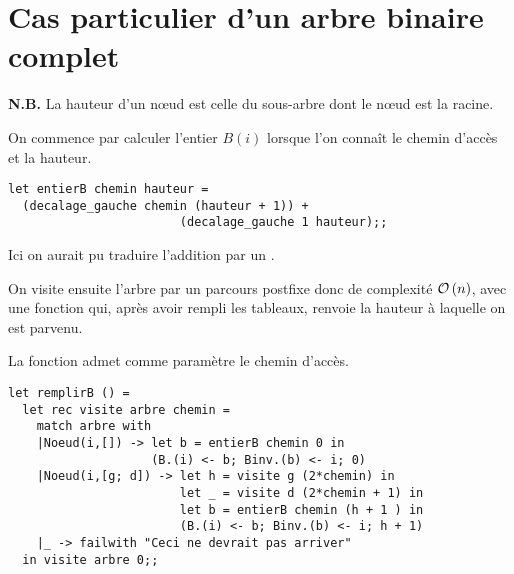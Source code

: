 \section{Cas particulier d'un arbre binaire complet}
{\bf N.B.} La hauteur d'un nœud est celle du sous-arbre dont le nœud est la racine.
\begin{Exercise}On commence par calculer l'entier $B(i)$ lorsque l'on connaît le chemin d'accès et la hauteur.

\begin{lstlisting}
let entierB chemin hauteur = 
  (decalage_gauche chemin (hauteur + 1)) + 
                        (decalage_gauche 1 hauteur);;
\end{lstlisting}

Ici on aurait pu traduire l'addition par un .

\medskip

On visite ensuite l'arbre par un parcours postfixe donc de complexité ${\cal O}\left(n\right)$, avec une fonction qui, après avoir rempli les tableaux, renvoie la hauteur à laquelle on est parvenu.

La fonction admet comme paramètre le chemin d'accès.

\begin{lstlisting}
let remplirB () =
  let rec visite arbre chemin =
    match arbre with
    |Noeud(i,[]) -> let b = entierB chemin 0 in 
                    (B.(i) <- b; Binv.(b) <- i; 0)
    |Noeud(i,[g; d]) -> let h = visite g (2*chemin) in
                        let _ = visite d (2*chemin + 1) in
                        let b = entierB chemin (h + 1 ) in
                        (B.(i) <- b; Binv.(b) <- i; h + 1)
    |_ -> failwith "Ceci ne devrait pas arriver"
  in visite arbre 0;;
\end{lstlisting}
\end{Exercise}
